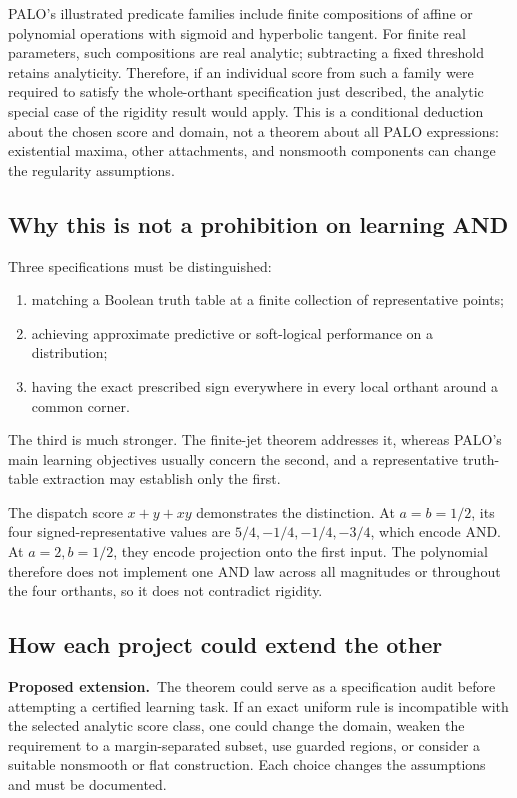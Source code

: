 \documentclass[11pt,a4paper]{article}
\theoremstyle{remark}
\newcommand{\proposal}{\textbf{Proposed extension.}\ }
\begin{document}
PALO's illustrated predicate families include finite compositions of affine or polynomial operations with sigmoid and hyperbolic tangent. For finite real parameters, such compositions are real analytic; subtracting a fixed threshold retains analyticity. Therefore, if an individual score from such a family were required to satisfy the whole-orthant specification just described, the analytic special case of the rigidity result would apply. This is a conditional deduction about the chosen score and domain, not a theorem about all PALO expressions: existential maxima, other attachments, and nonsmooth components can change the regularity assumptions.

\subsection{Why this is not a prohibition on learning AND}
Three specifications must be distinguished:
\begin{enumerate}
\item matching a Boolean truth table at a finite collection of representative points;
\item achieving approximate predictive or soft-logical performance on a distribution;
\item having the exact prescribed sign everywhere in every local orthant around a common corner.
\end{enumerate}
The third is much stronger. The finite-jet theorem addresses it, whereas PALO's main learning objectives usually concern the second, and a representative truth-table extraction may establish only the first.

The dispatch score $x+y+xy$ demonstrates the distinction. At $a=b=1/2$, its four signed-representative values are $5/4,-1/4,-1/4,-3/4$, which encode AND. At $a=2,b=1/2$, they encode projection onto the first input. The polynomial therefore does not implement one AND law across all magnitudes or throughout the four orthants, so it does not contradict rigidity.

\subsection{How each project could extend the other}
\proposal The theorem could serve as a specification audit before attempting a certified learning task. If an exact uniform rule is incompatible with the selected analytic score class, one could change the domain, weaken the requirement to a margin-separated subset, use guarded regions, or consider a suitable nonsmooth or flat construction. Each choice changes the assumptions and must be documented.
\end{document}
